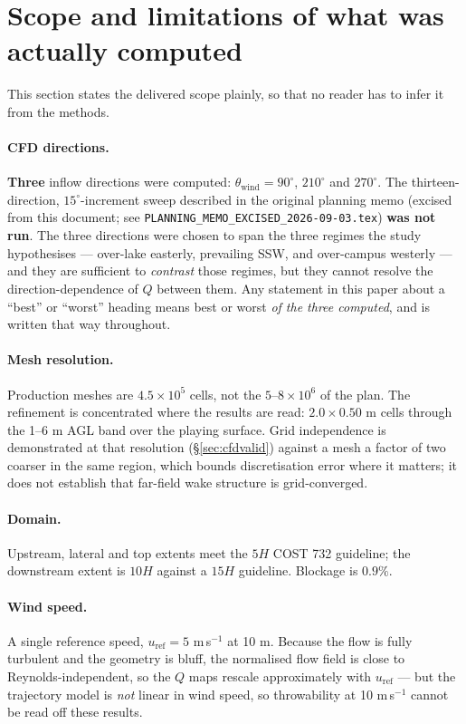 \documentclass[11pt,letterpaper]{article}
\begin{document}
\section{Scope and limitations of what was actually computed}
\label{sec:limits}

This section states the delivered scope plainly, so that no reader has to infer
it from the methods.

\paragraph{CFD directions.} \textbf{Three} inflow directions were computed:
$\theta_{\text{wind}} = 90^\circ$, $210^\circ$ and $270^\circ$. The
thirteen-direction, $15^\circ$-increment sweep described in the original
planning memo (excised from this document; see
\texttt{PLANNING\_MEMO\_EXCISED\_2026-09-03.tex}) \textbf{was not run}. The three directions were chosen to
span the three regimes the study hypothesises --- over-lake easterly,
prevailing SSW, and over-campus westerly --- and they are sufficient to
\emph{contrast} those regimes, but they cannot resolve the direction-dependence
of $Q$ between them. Any statement in this paper about a ``best'' or ``worst''
heading means best or worst \emph{of the three computed}, and is written that
way throughout.

\paragraph{Mesh resolution.} Production meshes are $4.5 \times 10^{5}$ cells,
not the $5$--$8 \times 10^{6}$ of the plan. The refinement is concentrated where
the results are read: $2.0 \times 0.50$ m cells through the 1--6 m AGL band over
the playing surface. Grid independence is demonstrated at that resolution
(\S\ref{sec:cfdvalid}) against a mesh a factor of two coarser in the same
region, which bounds discretisation error where it matters; it does not
establish that far-field wake structure is grid-converged.

\paragraph{Domain.} Upstream, lateral and top extents meet the $5H$ COST 732
guideline; the downstream extent is $10H$ against a $15H$ guideline. Blockage is
$0.9\%$.

\paragraph{Wind speed.} A single reference speed,
$u_{\text{ref}} = 5$ m\,s$^{-1}$ at 10 m. Because the flow is fully turbulent
and the geometry is bluff, the normalised flow field is close to
Reynolds-independent, so the $Q$ maps rescale approximately with
$u_{\text{ref}}$ --- but the trajectory model is \emph{not} linear in wind
speed, so throwability at 10 m\,s$^{-1}$ cannot be read off these results.
\end{document}
